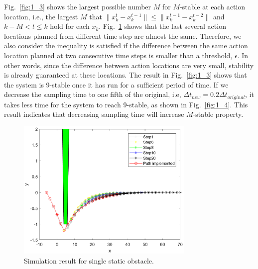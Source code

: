 \documentclass{ifacconf}
\begin{document}




Fig.~\ref{fig:1_3} shows the largest possible number $M$ for $M$-stable at each action location, i.e., the largest $M$ that  $\|x_{k}^t-x_k^{t-1}\|\leq \|x_k^{t-1}-x_k^{t-2}\|$ and $k-M< t\leq k$ hold for each $x_k$. Fig.~\ref{fig:1_1} shows that the last several action locations planned from different time step are almost the same. Therefore, we also consider the inequality is satisfied if the difference between the same action location planned at two consecutive time steps is smaller than a threshold, $\epsilon$. In other words, since the difference between action locations are very small, stability is already guaranteed at these locations. The result in Fig.~\ref{fig:1_3} shows that the system is 9-stable once it has run for a sufficient period of time. If we decrease the sampling time to one fifth of the original, i.e, $\Delta t_{new}=0.2\Delta t_{original}$, it takes less time for the system to reach 9-stable, as shown in Fig.~\ref{fig:1_4}. This result indicates that decreasing sampling time will increase $M$-stable property.

 

\begin{figure}[htbp]
\begin{center}
\includegraphics[width=8.5cm]{plot/1_1.eps}
\caption{Simulation result for single static obstacle.  }
\label{fig:1_1}
\end{center}
\end{figure}
\end{document}
